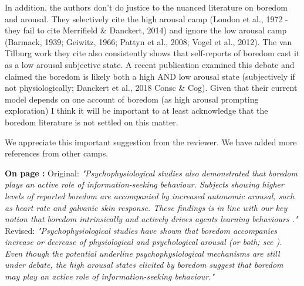 \documentclass[utf8]{article}
\newenvironment{reply}  
    {\color{Blue}\noindent\newline}
    {\newline}
\newcommand{\revise}[3]{
    \noindent
    \newline
    \textbf{On page {#1}:}\newline
    \newline
    Original:\newline
    \textit{"#2"}
    \newline
    \newline
    Revised:\newline
    \textit{"#3"}\newline}
\begin{document}
        
        In addition, the authors don't do justice to the nuanced literature on boredom and arousal. They selectively cite the high arousal camp (London et al., 1972 - they fail to cite Merrifield \& Danckert, 2014) and ignore the low arousal camp (Barmack, 1939; Geiwitz, 1966; Pattyn et al., 2008; Vogel et al., 2012). The van Tilburg work they cite also consistently shows that self-reports of boredom cast it as a low arousal subjective state. A recent publication examined this debate and claimed the boredom is likely both a high AND low arousal state (subjectively if not physiologically; Danckert et al., 2018 Consc \& Cog). Given that their current model depends on one account of boredom (as high arousal prompting exploration) I think it will be important to at least acknowledge that the boredom literature is not settled on this matter.
        
        \begin{reply}
            We appreciate this important suggestion from the reviewer. We have added more references from other camps.

            \revise{\pageref{rev:arousal}}
                {Psychophysiological studies also demonstrated that boredom plays an active role of information-seeking behaviour. Subjects showing higher levels of reported boredom are accompanied by increased autonomic arousal, such as heart rate and galvanic skin response. These findings is in line with our key notion that boredom intrinsically and actively drives agents learning behaviours \citep{london1972increase, harris2000correlates}.}
                {Psychophysiological studies have shown that boredom accompanies increase \citep{berlyne1960conflict, london1972increase, harris2000correlates} or decrease \citep{barmack1939definition, geiwitz1966structure, pattyn2008psychophysiological, vogel2012definition, mikulas1993essence} of physiological and psychological arousal (or both; see \cite{eastwood2012unengaged, fahlman2013development, Merrifield2014, Danckert.2018}). Even though the potential underline psychophysiological mechanisms are still under debate, the high arousal states elicited by boredom suggest that boredom may play an active role of information-seeking behaviour.}
        \end{reply}
        
        
         
\end{document}

